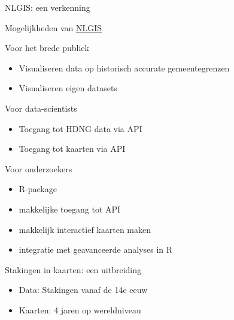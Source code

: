 \documentclass[ignorenonframetext,]{beamer}
\begin{document}
\begin{frame}{NLGIS: een verkenning}

Mogelijkheden van \href{https://nlgis.nl}{NLGIS}

\begin{block}{Voor het brede publiek}

\begin{itemize}
\itemsep1pt\parskip0pt
\item
  Visualiseren data op historisch accurate gemeentegrenzen
\item
  Visualiseren eigen datasets
\end{itemize}

\end{block}

\begin{block}{Voor data-scientists}

\begin{itemize}
\itemsep1pt\parskip0pt
\item
  Toegang tot HDNG data via API
\item
  Toegang tot kaarten via API
\end{itemize}

\end{block}

\begin{block}{Voor onderzoekers}

\begin{itemize}
\itemsep1pt\parskip0pt
\item
  R-package
\item
  makkelijke toegang tot API
\item
  makkelijk interactief kaarten maken
\item
  integratie met geavanceerde analyses in R
\end{itemize}

\end{block}

\end{frame}

\begin{frame}{Stakingen in kaarten: een uitbreiding}

\begin{itemize}
\itemsep1pt\parskip0pt
\item
  Data: Stakingen vanaf de 14e eeuw
\item
  Kaarten: 4 jaren op wereldniveau
\end{itemize}

\end{frame}
\end{document}
